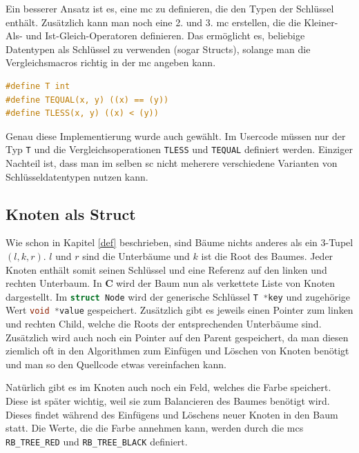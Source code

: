 \documentclass[11pt]{article}
\newcommand{\lstin}[1]{\lstinline[language=C]{#1}}
\newcommand{\cpl}{\textbf{C}$\;$}
\begin{document}
Ein besserer Ansatz ist es, eine \gls{mc} zu definieren, die den Typen der Schlüssel enthält. Zusätzlich kann man noch eine 2. und 3. \gls{mc} erstellen, die die Kleiner-Als- und Ist-Gleich-Operatoren definieren.
Das ermöglicht es, beliebige Datentypen als Schlüssel zu verwenden (sogar Structs), solange man die Vergleichsmacros richtig in der \gls{mc} angeben kann.

\begin{lstlisting}[language=C]
#define T int
#define TEQUAL(x, y) ((x) == (y))
#define TLESS(x, y) ((x) < (y))
\end{lstlisting}

Genau diese Implementierung wurde auch gewählt. Im Usercode müssen nur der Typ \lstin{T} und die Vergleichsoperationen \lstin{TLESS} und \lstin{TEQUAL} definiert werden. Einziger Nachteil ist, dass man im selben \gls{sc} nicht meherere verschiedene Varianten von Schlüsseldatentypen nutzen kann.

\subsection{Knoten als Struct}
Wie schon in Kapitel \ref{def} beschrieben, sind Bäume nichts anderes als ein 3-Tupel $(l, k, r)$.
$l$ und $r$ sind die Unterbäume und $k$ ist die Root des Baumes.
Jeder Knoten enthält somit seinen Schlüssel und eine Referenz auf den linken und rechten Unterbaum.
In \cpl wird der Baum nun als verkettete Liste von Knoten dargestellt.
Im \lstin{struct Node} wird der generische Schlüssel \lstin{T *key} und zugehörige Wert \lstin{void *value} gespeichert.
Zusätzlich gibt es jeweils einen Pointer zum linken und rechten Child, welche die Roots der entsprechenden Unterbäume sind. Zusätzlich wird auch noch ein Pointer auf den Parent gespeichert,
da man diesen ziemlich oft in den Algorithmen zum Einfügen und Löschen von Knoten benötigt und man so den Quellcode etwas vereinfachen kann.

Natürlich gibt es im Knoten auch noch ein Feld, welches die Farbe speichert. Diese ist später wichtig, weil sie zum Balancieren des Baumes benötigt wird.
Dieses findet während des Einfügens und Löschens neuer Knoten in den Baum statt. Die Werte, die die Farbe annehmen kann, werden durch die \glspl{mc} \lstin{RB_TREE_RED} und \lstin{RB_TREE_BLACK} definiert.
\end{document}
